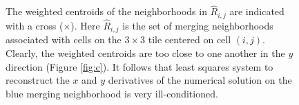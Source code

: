 \begin{figure}
    \centering
     \hfill
     \hfill
    \caption{\sf 
    The weighted centroids of the neighborhoods in $\widehat{R}_{i,j}$ are indicated with a cross ($\times$).  
    Here $\widehat{R}_{i,j}$ is the set of merging neighborhoods associated
    with cells on the $3\times3$ tile centered on cell $(i,j)$.
    Clearly, the weighted centroids are too close to one another in the $y$ direction (Figure \ref{fig:c}).  It follows that least squares system to reconstruct the $x$ and $y$ derivatives of the numerical solution on the blue merging neighborhood is very ill-conditioned.
}
    \label{fig:tooclose}
\end{figure}

